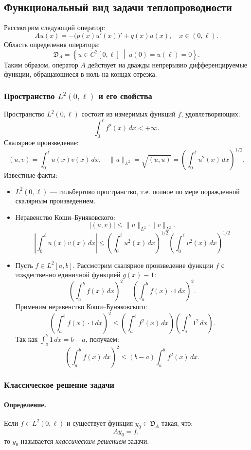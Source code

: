 \subsection{Функциональный вид задачи теплопроводности}

Рассмотрим следующий оператор:
\[
A u(x) = -\big(p(x) u'(x)\big)' + q(x) u(x), \quad x \in (0, \ell).
\]
Область определения оператора:
\[
\mathfrak{D}_A = \left\{ u \in C^2[0,\ell] \ \middle|\ u(0) = u(\ell) = 0 \right\}.
\]
Таким образом, оператор $A$ действует на дважды непрерывно дифференцируемые функции, обращающиеся в ноль на концах отрезка.

\subsubsection{Пространство $L^2(0,\ell)$ и его свойства}
Пространство $L^2(0,\ell)$ состоит из измеримых функций $f$, удовлетворяющих:
\[
\int_0^\ell f^2(x) \, dx < +\infty.
\]
Скалярное произведение:
\[
(u, v) = \int_0^\ell u(x) v(x) \, dx, \quad \|u\|_{L^2} = \sqrt{(u, u)}= \left( \int_0^\ell u^2(x) \, dx \right)^{1/2}.
\]
Известные факты:
\begin{itemize}
  \item $L^2(0,\ell)$ — гильбертово пространство, т.е. полное по мере поражденной скалярным произведением.
  \item Неравенство Коши--Буняковского:
  \[
  |(u, v)| \leq \|u\|_{L^2} \cdot \|v\|_{L^2}.
  \]
  \[
  | \int_0^\ell u(x) v(x) \, dx | \le \left( \int_0^\ell u^2(x) \, dx \right)^{1/2} \left( \int_0^\ell v^2(x) \, dx \right)^{1/2}
  \]
  \item Пусть $f \in L^2[a,b]$. Рассмотрим скалярное произведение функции $f$ с тождественно единичной функцией $g(x) \equiv 1$:
    \[
    \left( \int_a^b f(x) \, dx \right)^2 = \left( \int_a^b f(x) \cdot 1 \, dx \right)^2.
    \]
    Применим неравенство Коши--Буняковского:
    \[
    \left( \int_a^b f(x) \cdot 1 \, dx \right)^2 \le \left( \int_a^b f^2(x) \, dx \right) \left( \int_a^b 1^2 \, dx \right).
    \]
    Так как $\int_a^b 1 \, dx = b - a$, получаем:
    \[
    \left( \int_a^b f(x) \, dx \right)^2 \le (b - a) \int_a^b f^2(x) \, dx.
    \]
\end{itemize}

\subsubsection{Классическое решение задачи}

\paragraph{Определение.} Если $f \in L^2(0,\ell)$ и существует функция $y_0 \in \mathfrak{D}_A$ такая, что:
\[
A y_0 = f,
\]
то $y_0$ называется \textit{классическим решением} задачи.

